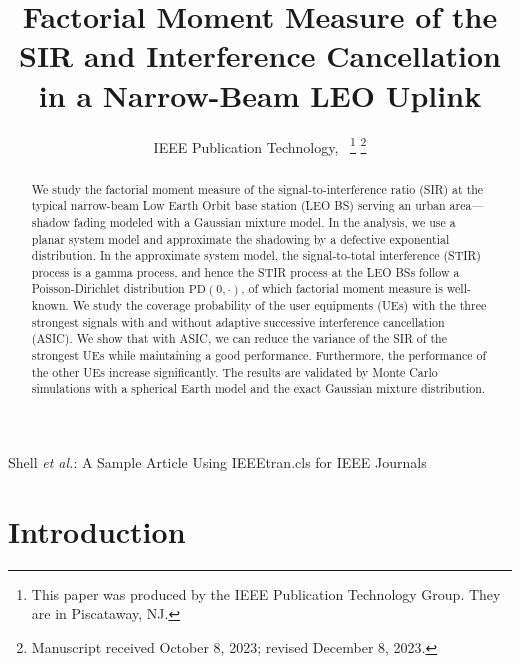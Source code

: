 \documentclass[lettersize,journal]{IEEEtran}
\begin{document}
\title{Factorial Moment Measure of the SIR and Interference Cancellation in a Narrow-Beam LEO Uplink}
\author{IEEE Publication Technology,~
\thanks{This paper was produced by the IEEE Publication Technology Group. They are in Piscataway, NJ.}%
\thanks{Manuscript received October 8, 2023; revised December 8, 2023.}}

%
{Shell \MakeLowercase{\textit{et al.}}: A Sample Article Using IEEEtran.cls for IEEE Journals}

\IEEEpubid{}


\maketitle
\begin{abstract}
  We study the factorial moment measure of the signal-to-interference ratio (SIR) at the typical narrow-beam Low Earth Orbit base station (LEO BS) serving an urban area---shadow fading modeled with a Gaussian mixture model. In the analysis, we use a planar system model and approximate the shadowing by a defective exponential distribution. In the approximate system model, the signal-to-total interference (STIR) process is a gamma process, and hence the STIR process at the LEO BSs follow a Poisson-Dirichlet distribution $\text{PD}(0,\cdot)$, of which factorial moment measure is well-known. We study the coverage probability of the user equipments (UEs) with the three strongest signals with and without adaptive successive interference cancellation (ASIC). We show that with ASIC, we can reduce the variance of the SIR of the strongest UEs while maintaining a good performance. Furthermore, the performance of the other UEs increase significantly. The results are validated by Monte Carlo simulations with a spherical Earth model and the exact Gaussian mixture distribution.

\end{abstract}

\begin{IEEEkeywords}
  
\end{IEEEkeywords}


\section{Introduction}
\end{document}
